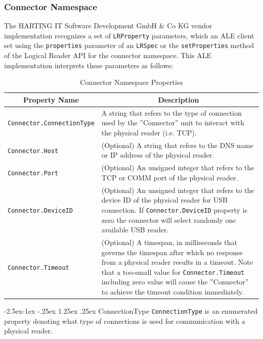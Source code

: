 \documentclass[11pt,a4paper,oneside]{article}
\makeatletter
\renewcommand\paragraph{\@startsection{paragraph}{4}{\z@}%
            {-2.5ex\@plus -1ex \@minus -.25ex}%
            {1.25ex \@plus .25ex}%
            {\normalfont\normalsize\bfseries}}
\makeatother
\begin{document}
\subsubsection{Connector Namespace}
The HARTING IT Software Development GmbH \& Co KG vendor implementation recognizes a set of \texttt{LRProperty} parameters, which an ALE client set using the \texttt{properties} parameter of an \texttt{LRSpec} or the \texttt{setProperties} method of the Logical Reader API for the connector namespace. This ALE implementation interprets these parameters as follows:

\begin{table}[!h]
\begin{tabular}{ 
|p{}%
|p{}|%
}
\hline
\multicolumn{1}{|c|}{\textbf{Property Name}}&
\multicolumn{1}{c|}{\textbf{Description}}\\
\hline
\texttt{Connector.ConnectionType}&A string that refers to the type of connection used by the ''Connector'' unit to interact with the physical reader (i.e. TCP).\\
\hline
\texttt{Connector.Host}&(Optional) A string that refers to the DNS name or IP address of the physical reader.\\
\hline
\texttt{Connector.Port}&(Optional) An unsigned integer that refers to the TCP or COMM port of the physical reader.\\
\hline
\texttt{Connector.DeviceID}&(Optional) An unsigned integer that refers to the device ID of the physical reader for USB connection. If \texttt{Connector.DeviceID} property is zero the connector will select randomly one available USB reader.\\
\hline
\texttt{Connector.Timeout}&(Optional) A timespan, in milliseconds that governs the timespan after which no response from a physical reader results in a timeout. Note that a too-small value for \texttt{Connector.Timeout} including zero value will cause the ''Connector'' to achieve the timeout condition immediately.\\
\hline
\end {tabular}
\caption{Connector Namespace Properties}
\MakeLineNo
\end{table}
\FloatBarrier

\paragraph{ConnectionType}
\texttt{ConnectionType} is an enumerated property denoting what type of connections is used for communication with a physical reader.
\end{document}
